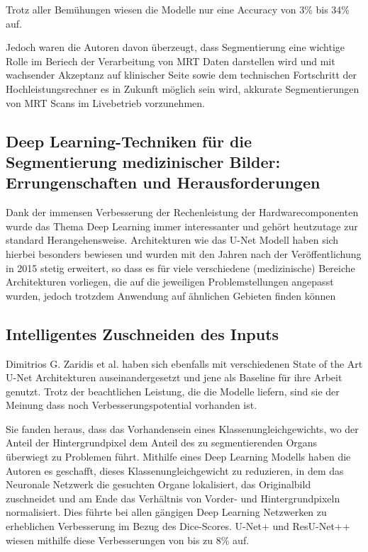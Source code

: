 Trotz aller Bemühungen wiesen die Modelle nur eine Accuracy von 3\% bis 34\% auf. \citep{Clarke:Mri1995}

Jedoch waren die Autoren davon überzeugt, dass Segmentierung eine wichtige Rolle im Beriech der Verarbeitung von MRT Daten darstellen wird und mit wachsender Akzeptanz auf klinischer Seite sowie dem technischen Fortschritt der Hochleistungsrechner es in Zukunft möglich sein wird, akkurate Segmentierungen von MRT Scans im Livebetrieb vorzunehmen.

\newpage

\subsection{Deep Learning-Techniken für die Segmentierung medizinischer Bilder:
Errungenschaften und Herausforderungen}

Dank der immensen Verbesserung der Rechenleistung der Hardwarecomponenten wurde das Thema Deep Learning immer interessanter und gehört heutzutage zur standard Herangehensweise. Architekturen wie das U-Net Modell \citep{U-Net} haben sich hierbei besonders bewiesen und wurden mit den Jahren nach der Veröffentlichung in 2015 stetig erweitert, so dass es für viele verschiedene (medizinische) Bereiche Architekturen vorliegen, die auf die jeweiligen Problemstellungen angepasst wurden, jedoch trotzdem Anwendung auf ähnlichen Gebieten finden können \citep{Hesamian}

\subsection{Intelligentes Zuschneiden des Inputs}

Dimitrios G. Zaridis et al. \citep{SmartCrop} haben sich ebenfalls mit verschiedenen State of the Art U-Net Architekturen auseinandergesetzt und jene als Baseline für ihre Arbeit genutzt. Trotz der beachtlichen Leistung, die die Modelle liefern, sind sie der Meinung dass noch Verbesserungspotential vorhanden ist.

Sie fanden heraus, dass das Vorhandensein eines Klassenungleichgewichts, wo der Anteil der Hintergrundpixel dem Anteil des zu segmentierenden Organs überwiegt zu Problemen führt. Mithilfe eines Deep Learning Modells haben die Autoren es geschafft, dieses Klassenungleichgewicht zu reduzieren, in dem das Neuronale Netzwerk die gesuchten Organe lokalisiert, das Originalbild zuschneidet und am Ende das Verhältnis von Vorder- und Hintergrundpixeln normalisiert. Dies führte bei allen gängigen Deep Learning Netzwerken zu erheblichen Verbesserung im Bezug des Dice-Scores. U-Net+ und ResU-Net++ wiesen mithilfe diese Verbesserungen von bis zu 8\% auf.

